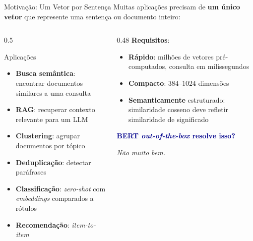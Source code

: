 \documentclass[aspectratio=169, xcolor=dvipsnames]{beamer}
\begin{document}
  \begin{frame}{Motivação: Um Vetor por Sentença}
    \small
    Muitas aplicações precisam de \textbf{um único vetor} que represente uma sentença ou documento inteiro:
    \vspace{0.4em}
    \begin{columns}
      \begin{column}{0.5\textwidth}
        \begin{block}{Aplicações}
          \begin{itemize}
            \item \textbf{Busca semântica}: encontrar documentos similares a uma consulta
            \item \textbf{RAG}: recuperar contexto relevante para um LLM
            \item \textbf{Clustering}: agrupar documentos por tópico
            \item \textbf{Deduplicação}: detectar paráfrases
            \item \textbf{Classificação}: \textit{zero-shot} com \textit{embeddings} comparados a rótulos
            \item \textbf{Recomendação}: \textit{item-to-item}
          \end{itemize}
        \end{block}
      \end{column}
      \begin{column}{0.48\textwidth}
        \textbf{Requisitos}:
        \begin{itemize}
          \item \textbf{Rápido}: milhões de vetores pré-computados, consulta em milissegundos
          \item \textbf{Compacto}: $384$--$1024$ dimensões
          \item \textbf{Semanticamente} estruturado: similaridade cosseno deve refletir similaridade de significado
        \end{itemize}
        \vspace{0.3em}
        \textcolor{DarkBlue}{\textbf{BERT \textit{out-of-the-box} resolve isso?}}

        \vspace{0.2em}
        \textit{Não muito bem.}
      \end{column}
    \end{columns}
  \end{frame}
\end{document}
